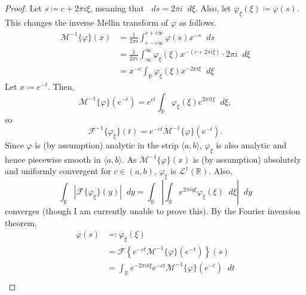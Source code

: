 \documentclass[a4paper]{article}
\newcommand*\diff{\mathop{}\!d} %
\newcommand{\R}{\mathbb{R}}
\theoremstyle{definition}
\begin{document}
\begin{proof}
    Let $s \coloneq c + 2\pi i \xi$, meaning that $\diff s = 2\pi i \diff \xi$.
    Also, let $\varphi_\xi (\xi) \coloneq \varphi(s)$.
    This changes the inverse Mellin transform of $\varphi$ as follows.
    \begin{align*}
        \mathcal{M}^{-1}\{\varphi\}(x) & = \frac{1}{2\pi i} \int_{c-i\infty}^{c+i\infty} \varphi (s) x^{-s} \diff s                           \\
                                       & = \frac{1}{2\pi i} \int_\infty^\infty \varphi_\xi (\xi) x^{-(c + 2\pi i \xi)} \cdot 2\pi i \diff \xi \\
                                       & = x^{-c} \int_\R \varphi_\xi (\xi) x^{-2\pi i \xi} \diff \xi
    \end{align*}
    Let $x \coloneq e^{-t}$.
    Then,
    \begin{equation*}
        \mathcal{M}^{-1}\{\varphi\}\left(e^{-t}\right) = e^{ct} \int_\R \varphi_\xi (\xi) e^{2\pi i t \xi} \diff \xi,
    \end{equation*}
    so
    \begin{equation*}
        \mathcal{F}^{-1}\{\varphi_\xi\}(t) = e^{-ct} \mathcal{M}^{-1}\{\varphi\}\left(e^{-t}\right).
    \end{equation*}
    Since $\varphi$ is (by assumption) analytic in the strip $\langle a,b \rangle$, $\varphi_\xi$ is also analytic and hence piecewise smooth in $\langle a,b \rangle$.
    As $\mathcal{M}^{-1}\{\varphi\}(x)$ is (by assumption) absolutely and uniformly convergent for $c \in (a,b)$, $\varphi_\xi$ is $\mathcal{L}^1(\R)$.
    Also,
    \begin{equation*}
        \int_\R \left\lvert \mathcal{F}\{\varphi_\xi\}(y) \right\rvert \diff y = \int_\R \left\lvert \int_\R e^{2\pi i y \xi} \varphi_\xi(\xi) \diff \xi \right\rvert \diff y
    \end{equation*}
    converges (though I am currently unable to prove this). %
    By the Fourier inversion theorem,
    \begin{align*}
        \varphi(s) & \eqcolon \varphi_\xi(\xi)                                                                  \\
                   & = \mathcal{F}\left\{ e^{-ct} \mathcal{M}^{-1}\{\varphi\}\left(e^{-t}\right) \right\}(s)    \\
                   & = \int_\R e^{-2\pi i t \xi} e^{-ct} \mathcal{M}^{-1}\{\varphi\}\left(e^{-t}\right) \diff t \\

\end{align*}
\end{proof}
\end{document}
